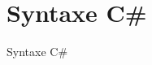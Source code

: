 \section{Syntaxe C\#}

\begingroup
{}
\begin{frame}
    \begin{center}
        \vspace{1cm}
        {\Large\color{background}
            Syntaxe C\#
        }
    \end{center}
\end{frame}
\endgroup
